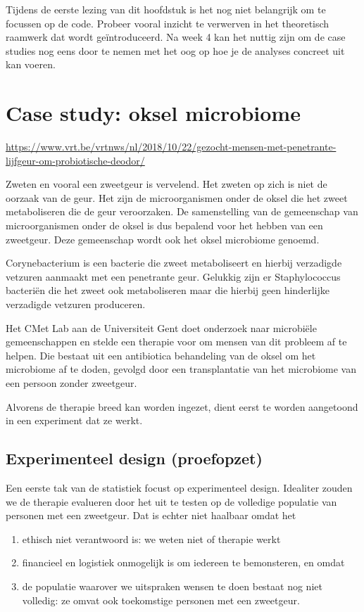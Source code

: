 \documentclass[
  12pt,dutch]{book}
\providecommand{\tightlist}{%
  \setlength{\itemsep}{0pt}\setlength{\parskip}{0pt}}
\theoremstyle{definition}
\theoremstyle{definition}
\theoremstyle{definition}
\theoremstyle{definition}
\theoremstyle{remark}
\begin{document}
Tijdens de eerste lezing van dit hoofdstuk is het nog niet belangrijk om te focussen op de code. Probeer vooral inzicht te verwerven in het theoretisch raamwerk dat wordt geïntroduceerd. Na week 4 kan het nuttig zijn om de case studies nog eens door te nemen met het oog op hoe je de analyses concreet uit kan voeren.

\section{Case study: oksel microbiome}\label{case-study-oksel-microbiome}

\url{https://www.vrt.be/vrtnws/nl/2018/10/22/gezocht-mensen-met-penetrante-lijfgeur-om-probiotische-deodor/}

Zweten en vooral een zweetgeur is vervelend.
Het zweten op zich is niet de oorzaak van de geur.
Het zijn de microorganismen onder de oksel die het zweet metaboliseren die de geur veroorzaken.
De samenstelling van de gemeenschap van microorganismen onder de oksel is dus bepalend voor het hebben van een zweetgeur.
Deze gemeenschap wordt ook het oksel microbiome genoemd.

Corynebacterium is een bacterie die zweet metaboliseert en hierbij verzadigde vetzuren aanmaakt met een penetrante geur.
Gelukkig zijn er Staphylococcus bacteriën die het zweet ook metaboliseren maar die hierbij geen hinderlijke verzadigde vetzuren produceren.

Het CMet Lab aan de Universiteit Gent doet onderzoek naar microbiële gemeenschappen en stelde een therapie voor om mensen van dit probleem af te helpen.
Die bestaat uit een antibiotica behandeling van de oksel om het microbiome af te doden,
gevolgd door een transplantatie van het microbiome van een persoon zonder zweetgeur.

Alvorens de therapie breed kan worden ingezet, dient eerst te worden aangetoond in een experiment dat ze werkt.

\subsection{Experimenteel design (proefopzet)}\label{experimenteel-design-proefopzet}

Een eerste tak van de statistiek focust op experimenteel design.
Idealiter zouden we de therapie evalueren door het uit te testen op de volledige populatie van personen met een zweetgeur.
Dat is echter niet haalbaar omdat het

\begin{enumerate}
\def\labelenumi{\arabic{enumi}.}
\tightlist
\item
  ethisch niet verantwoord is: we weten niet of therapie werkt
\item
  financieel en logistiek onmogelijk is om iedereen te bemonsteren, en omdat
\item
  de populatie waarover we uitspraken wensen te doen bestaat nog niet volledig: ze omvat ook toekomstige personen met een zweetgeur.
\end{enumerate}
\end{document}
